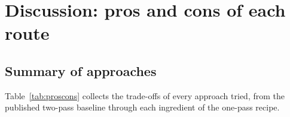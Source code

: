 \documentclass[11pt,a4paper]{article}
\begin{document}
\section{Discussion: pros and cons of each route}\label{sec:discussion}

\subsection{Summary of approaches}

Table~\ref{tab:proscons} collects the trade-offs of every approach tried,
from the published two-pass baseline through each ingredient of the one-pass
recipe.
\end{document}
